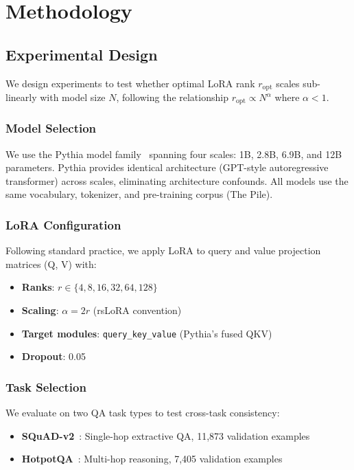 \section{Methodology}

\subsection{Experimental Design}

We design experiments to test whether optimal LoRA rank $r_{\text{opt}}$ scales sub-linearly with model size $N$, following the relationship $r_{\text{opt}} \propto N^\alpha$ where $\alpha < 1$.

\subsubsection{Model Selection}

We use the Pythia model family~\cite{biderman2023pythia} spanning four scales: 1B, 2.8B, 6.9B, and 12B parameters. Pythia provides identical architecture (GPT-style autoregressive transformer) across scales, eliminating architecture confounds. All models use the same vocabulary, tokenizer, and pre-training corpus (The Pile).

\subsubsection{LoRA Configuration}

Following standard practice, we apply LoRA to query and value projection matrices (Q, V) with:
\begin{itemize}
    \item \textbf{Ranks}: $r \in \{4, 8, 16, 32, 64, 128\}$
    \item \textbf{Scaling}: $\alpha = 2r$ (rsLoRA convention)
    \item \textbf{Target modules}: \texttt{query\_key\_value} (Pythia's fused QKV)
    \item \textbf{Dropout}: 0.05
\end{itemize}

\subsubsection{Task Selection}

We evaluate on two QA task types to test cross-task consistency:
\begin{itemize}
    \item \textbf{SQuAD-v2}~\cite{rajpurkar2018squad}: Single-hop extractive QA, 11,873 validation examples
    \item \textbf{HotpotQA}~\cite{yang2018hotpotqa}: Multi-hop reasoning, 7,405 validation examples
\end{itemize}

